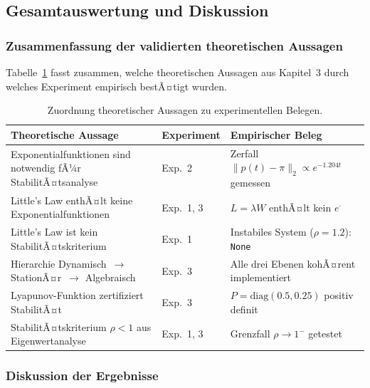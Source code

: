 ﻿\documentclass[a4paper,12pt]{scrreprt}
\theoremstyle{definition}
\begin{document}
\subsection{Gesamtauswertung und Diskussion}
\label{subsec:diskussion}

\subsubsection{Zusammenfassung der validierten theoretischen Aussagen}
\label{subsubsec:validierungen}

Tabelle~\ref{tab:validierungen} fasst zusammen, welche theoretischen
Aussagen aus Kapitel~3 durch welches Experiment empirisch bestÃ¤tigt
wurden.

\begin{table}[H]
	\centering
	\renewcommand{\arraystretch}{1.25}
	\begin{tabular}{@{}p{5.5cm}lp{4.5cm}@{}}
		\toprule
		\textbf{Theoretische Aussage} &
		\textbf{Experiment} &
		\textbf{Empirischer Beleg} \\
		\midrule
		Exponentialfunktionen sind notwendig fÃ¼r StabilitÃ¤tsanalyse &
		Exp.~2 &
		Zerfall $\|p(t)-\pi\|_2 \propto e^{-1.204t}$ gemessen \\
		
		Little's Law enthÃ¤lt keine Exponentialfunktionen &
		Exp.~1, 3 &
		$L = \lambda W$ enthÃ¤lt kein $e^{\cdot}$ \\
		
		Little's Law ist kein StabilitÃ¤tskriterium &
		Exp.~1 &
		Instabiles System ($\rho=1.2$): \texttt{None} \\
		
		Hierarchie Dynamisch~$\to$ StationÃ¤r~$\to$ Algebraisch &
		Exp.~3 &
		Alle drei Ebenen kohÃ¤rent implementiert \\
		
		Lyapunov-Funktion zertifiziert StabilitÃ¤t &
		Exp.~3 &
		$P = \text{diag}(0.5, 0.25)$ positiv definit \\
		
		StabilitÃ¤tskriterium $\rho < 1$ aus Eigenwertanalyse &
		Exp.~1, 3 &
		Grenzfall $\rho \to 1^-$ getestet \\
		\bottomrule
	\end{tabular}
	\caption{Zuordnung theoretischer Aussagen zu experimentellen Belegen.}
	\label{tab:validierungen}
\end{table}

\subsubsection{Diskussion der Ergebnisse}
\label{subsubsec:ergebnisse-diskussion}
\end{document}
